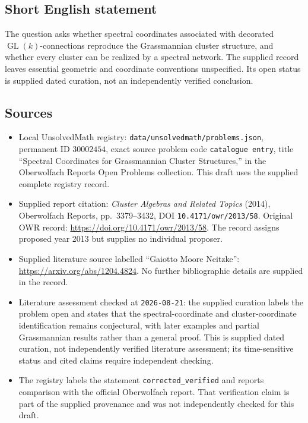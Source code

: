 \documentclass[11pt]{article}
\begin{document}
\subsection{Short English statement}
The question asks whether spectral coordinates associated with decorated \(\operatorname{GL}(k)\)-connections reproduce the Grassmannian cluster structure, and whether every cluster can be realized by a spectral network. The supplied record leaves essential geometric and coordinate conventions unspecified. Its open status is supplied dated curation, not an independently verified conclusion.
\subsection{Sources}
\begin{itemize}
\item Local UnsolvedMath registry: \texttt{data/unsolvedmath/problems.json}, permanent ID \(30002454\), exact source problem code \texttt{catalogue entry}, title ``Spectral Coordinates for Grassmannian Cluster Structures,'' in the Oberwolfach Reports Open Problems collection. This draft uses the supplied complete registry record.
\item Supplied report citation: \emph{Cluster Algebras and Related Topics} (2014), Oberwolfach Reports, pp.~3379--3432, DOI \texttt{10.4171/owr/2013/58}. Original OWR record: \url{https://doi.org/10.4171/owr/2013/58}. The record assigns proposed year 2013 but supplies no individual proposer.
\item Supplied literature source labelled ``Gaiotto Moore Neitzke'': \url{https://arxiv.org/abs/1204.4824}. No further bibliographic details are supplied in the record.
\item Literature assessment checked at \texttt{2026-08-21}: the supplied curation labels the problem open and states that the spectral-coordinate and cluster-coordinate identification remains conjectural, with later examples and partial Grassmannian results rather than a general proof. This is supplied dated curation, not independently verified literature assessment; its time-sensitive status and cited claims require independent checking.
\item The registry labels the statement \texttt{corrected\_verified} and reports comparison with the official Oberwolfach report. That verification claim is part of the supplied provenance and was not independently checked for this draft.
\end{itemize}
\end{document}

